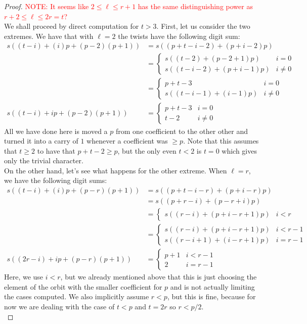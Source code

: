 \documentclass[12pt]{article}
\theoremstyle{customtheorem}%
\theoremstyle{remark}
\theoremstyle{definition}
\numberwithin{equation}{section}
\numberwithin{theorem}{section}
\begin{document}
\begin{proof}
\textcolor{red}{NOTE: It seems like $2 \leq \ell \leq r+1$ has the same distinguishing power as $r+2 \leq \ell \leq 2r=t$?}
\\

We shall proceed by direct computation for $t > 3$.
First, let us consider the two extremes. 
We have that with $\ell = 2$ the twists have the following digit sum:
\begin{align*}
 s((t-i) + (i)p + (p - 2)(p+1)) &= s((p + t - i - 2) + (p + i -2)p) \\ 
 &= \begin{cases}
   s((t-2) + (p-2+1)p) & i = 0 \\
   s((t-i-2) + (p+i-1)p)& i \neq 0
 \end{cases} \\
 &= \begin{cases}
   p+t - 3 & i = 0 \\
   s((t-i-1)+(i-1)p) & i \neq 0
 \end{cases} \\
 s((t-i) + ip + (p - 2)(p+1)) &= \begin{cases}
   p+t - 3 & i = 0 \\
   t-2 & i \neq 0
 \end{cases}
\end{align*}
All we have done here is moved a $p$ from one coefficient to the other other and turned it into a carry of $1$ whenever a coefficient was $\geq p$. 
Note that this assumes that $t \geq 2$ to have that $p+t-2 \geq p$, but the only even $t < 2$ is $t =0$ which gives only the trivial character.
\\

On the other hand, let's see what happens for the other extreme. 
When $\ell = r$, we have the following digit sums:
\begin{align*}
 s((t-i) + (i)p + (p - r)(p+1)) &= s((p + t- i - r) +(p + i -r) p) \\ 
 &=s((p + r - i) + (p -r + i)p) \\
 &= \begin{cases}
s((r-i) + (p+i-r+1)p) & i < r
 \end{cases} \\
 &= \begin{cases}
s((r-i) + (p+i-r+1)p) & i < r-1 \\
 s((r-i+1) + (i-r+1)p) & i = r-1
 \end{cases} \\
  s((2r-i) + ip + (p - r)(p+1)) &= \begin{cases}
p+1 & i < r-1 \\
2 & i = r-1
 \end{cases}
\end{align*}
Here, we use $i < r$, but we already mentioned above that this is just choosing the element of the orbit with the smaller coefficient for $p$ and is not actually limiting the cases computed. 
We also implicitly assume $r < p$, but this is fine, because for now we are dealing with the case of $t < p$ and $t = 2r$ so $ r < p/2$.
\\


\end{proof}
\end{document}

